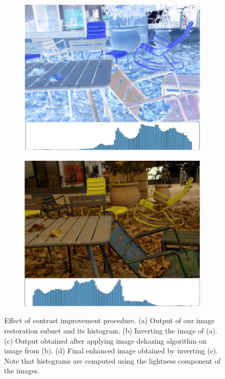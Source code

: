 \documentclass[letterpaper,12pt]{article}
\begin{document}
\begin{figure}[htbp]
\begin{subfigure}{0.22\textwidth}
			\end{subfigure}
			\begin{subfigure}{0.22\textwidth}
				\includegraphics[width=\linewidth]{effect_of_contrast/c}
				\captionsetup{font=scriptsize}
				\caption{}
				\label{fig: Effect_c}  
			\end{subfigure}
			\begin{subfigure}{0.22\textwidth}
				\includegraphics[width=\linewidth]{effect_of_contrast/d}
				\captionsetup{font=scriptsize}
				\caption{}
				\label{fig: Effect_d}
			\end{subfigure}
			
			\captionsetup{font=scriptsize}
			\caption{
				\label{fig: Effect of contrast improvement procedure}
				Effect of contrast improvement procedure. (a) Output of our image restoration subnet and its histogram. (b) Inverting the image of (a). (c) Output obtained after applying image dehazing algorithm \cite{he2010single} on image from (b). (d) Final enhanced image obtained by inverting (c). Note that histograms are computed using the lightness component of the images.
			}
		\end{figure}
		
\end{document}
